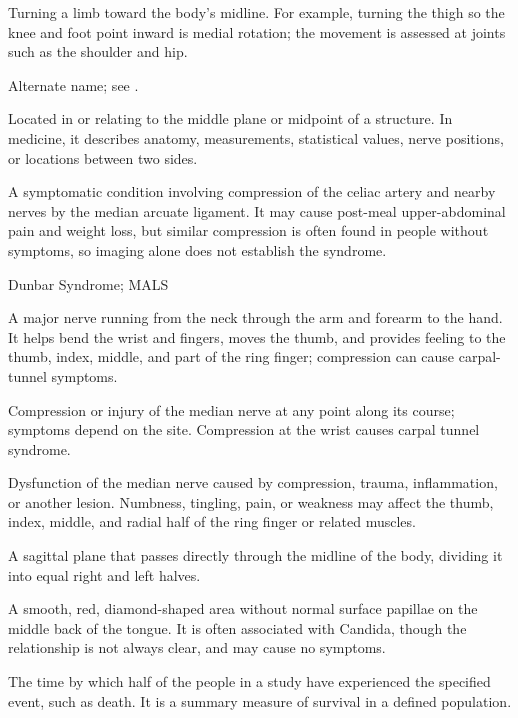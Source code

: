  Turning a limb toward the body's midline. For example, turning the thigh so the knee and foot point inward is medial rotation; the movement is assessed at joints such as the shoulder and hip.

 Alternate name; see .

 Located in or relating to the middle plane or midpoint of a structure. In medicine, it describes anatomy, measurements, statistical values, nerve positions, or locations between two sides.

 A symptomatic condition involving compression of the celiac artery and nearby nerves by the median arcuate ligament. It may cause post-meal upper-abdominal pain and weight loss, but similar compression is often found in people without symptoms, so imaging alone does not establish the syndrome.

\synonyms
Dunbar Syndrome; MALS

 A major nerve running from the neck through the arm and forearm to the hand. It helps bend the wrist and fingers, moves the thumb, and provides feeling to the thumb, index, middle, and part of the ring finger; compression can cause carpal-tunnel symptoms.

 Compression or injury of the median nerve at any point along its course; symptoms depend on the site. Compression at the wrist causes carpal tunnel syndrome.

 Dysfunction of the median nerve caused by compression, trauma, inflammation, or another lesion. Numbness, tingling, pain, or weakness may affect the thumb, index, middle, and radial half of the ring finger or related muscles.

 A sagittal plane that passes directly through the midline of the body, dividing it into
equal right and left halves.

 A smooth, red, diamond-shaped area without normal surface papillae on the middle back of the tongue. It is often associated with Candida, though the relationship is not always clear, and may cause no symptoms.

 The time by which half of the people in a study have experienced the specified event, such as death. It is a summary measure of survival in a defined population.

